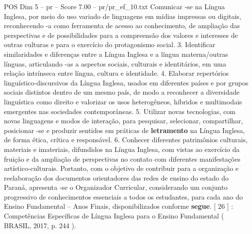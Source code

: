 \begin{textsample}{POS Dim 5 – pr – Score 7.00 – pr/pr\_ef\_10.txt}
Comunicar -se na Língua Inglesa, por meio do uso variado de linguagens em mídias impressas ou digitais, reconhecendo -a como ferramenta de acesso ao conhecimento, de ampliação das perspectivas e de possibilidades para a compreensão dos valores e interesses de outras culturas e para o exercício do protagonismo social. 3.
Identificar similaridades e diferenças entre a Língua Inglesa e a língua materna/outras línguas, articulando -as a aspectos sociais, culturais e identitários, em uma relação intrínseca entre língua, cultura e identidade. 4.
Elaborar repertórios linguístico-discursivos da Língua Inglesa, usados em diferentes países e por grupos sociais distintos dentro de um mesmo país, de modo a reconhecer a diversidade linguística como direito e valorizar os usos heterogêneos, híbridos e multimodais emergentes nas sociedades contemporâneas. 5.
Utilizar novas tecnologias, com novas linguagens e modos de interação, para pesquisar, selecionar, compartilhar, posicionar -se e produzir sentidos em práticas de \textbf{letramento} na Língua Inglesa, de forma ética, crítica e responsável. 6.
Conhecer diferentes patrimônios culturais, materiais e imateriais, difundidos na Língua Inglesa, com vistas ao exercício da fruição e da ampliação de perspectivas no contato com diferentes manifestações artístico-culturais.
Portanto, com o objetivo de contribuir para a organização e reelaboração dos documentos orientadores das redes de ensino do estado do Paraná, apresenta -se o Organizador Curricular, considerando um conjunto progressivo de conhecimentos essenciais a todos os estudantes, para cada ano do Ensino Fundamental – Anos Finais, disponibilizados conforme \textbf{segue}. [ 26 ] : Competências Específicas de Língua Inglesa para o Ensino Fundamental ( BRASIL, 2017, p. 244 ).

\end{textsample}
